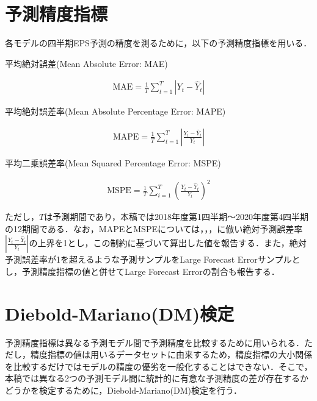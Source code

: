 \documentclass[a4paper，11pt]{jsarticle}
\begin{document}
\section{予測精度指標}

各モデルの四半期EPS予測の精度を測るために，以下の予測精度指標を用いる．

平均絶対誤差(Mean Absolute Error: MAE)

\begin{equation}
  \begin{split}
    \text{MAE} = \frac {1} {T} \sum^{T}_{t=1}\left| Y_t - \hat{Y}_t \right|
  \end{split}
\end{equation}

平均絶対誤差率(Mean Absolute Percentage Error: MAPE)

\begin{equation}
  \begin{split}
    \text{MAPE} = \frac {1} {T} \sum^{T}_{t=1}\left| \frac {Y_t - \hat{Y}_t} {Y_t} \right|
  \end{split}
\end{equation}

平均二乗誤差率(Mean Squared Percentage Error: MSPE)

\begin{equation}
  \begin{split}
    \text{MSPE} = \frac {1} {T} \sum^{T}_{i=1} \left( \frac {Y_t - \hat{Y}_t} {Y_t} \right) ^2
  \end{split}
\end{equation}

\noindent
ただし，$T$は予測期間であり，本稿では2018年度第1四半期～2020年度第4四半期の12期間である．なお，MAPEとMSPEについては，\cite*{brown1979univariate}，\cite*{lorek1996multivariate}，\cite{zhang2004neural}に倣い絶対予測誤差率$ \left| \frac{Y_t -{\hat Y}_t}{Y_t} \right|$の上界を1とし，この制約に基づいて算出した値を報告する．また，絶対予測誤差率が1を超えるような予測サンプルをLarge Forecast Errorサンプルとし，予測精度指標の値と併せてLarge Forecast Errorの割合も報告する．

\section{Diebold-Mariano(DM)検定}

予測精度指標は異なる予測モデル間で予測精度を比較するために用いられる．ただし，精度指標の値は用いるデータセットに由来するため，精度指標の大小関係を比較するだけではモデルの精度の優劣を一般化することはできない．そこで，本稿では異なる2つの予測モデル間に統計的に有意な予測精度の差が存在するかどうかを検定するために，Diebold-Mariano(DM)検定\citep*{diebold2002comparing}を行う．
\end{document}
